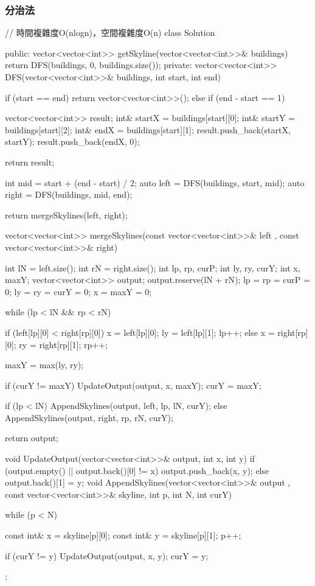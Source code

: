 \subsubsection{分治法}
\begin{Code}
// 時間複雜度O(nlogn)，空間複雜度O(n)
class Solution {
public:
    vector<vector<int>> getSkyline(vector<vector<int>>& buildings) {
        return DFS(buildings, 0, buildings.size());
    }
private:
    vector<vector<int>> DFS(vector<vector<int>>& buildings, int start, int end)
    {
        if (start == end)
        {
            return vector<vector<int>>();
        }
        else if (end - start == 1)
        {
            vector<vector<int>> result;
            int& startX = buildings[start][0];
            int& startY = buildings[start][2];
            int& endX = buildings[start][1];
            result.push_back({startX, startY});
            result.push_back({endX, 0});

            return result;
        }

        int mid = start + (end - start) / 2;
        auto left = DFS(buildings, start, mid);
        auto right = DFS(buildings, mid, end);

        return mergeSkylines(left, right);
    }
    vector<vector<int>> mergeSkylines(const vector<vector<int>>& left
                                      , const vector<vector<int>>& right)
    {
        int lN = left.size();
        int rN = right.size();
        int lp, rp, curP;
        int ly, ry, curY;
        int x, maxY;
        vector<vector<int>> output; output.reserve(lN + rN);
        lp = rp = curP = 0;
        ly = ry = curY = 0;
        x = maxY = 0;

        while (lp < lN && rp < rN)
        {
            if (left[lp][0] < right[rp][0])
            {
                x = left[lp][0];
                ly = left[lp][1];
                lp++;
            }
            else
            {
                x = right[rp][0];
                ry = right[rp][1];
                rp++;
            }

            maxY = max(ly, ry);

            if (curY != maxY)
            {
                UpdateOutput(output, x, maxY);
                curY = maxY;
            }
        }

        if (lp < lN)
            AppendSkylines(output, left, lp, lN, curY);
        else
            AppendSkylines(output, right, rp, rN, curY);


        return output;
    }
    void UpdateOutput(vector<vector<int>>& output, int x, int y)
    {
        if (output.empty() || output.back()[0] != x)
            output.push_back({x, y});
        else
            output.back()[1] = y;
    }
    void AppendSkylines(vector<vector<int>>& output
                        , const vector<vector<int>>& skyline, int p, int N, int curY)
    {
        while (p < N)
        {
            const int& x = skyline[p][0];
            const int& y = skyline[p][1];
            p++;

            if (curY != y)
            {
                UpdateOutput(output, x, y);
                curY = y;
            }
        }
    }
};
\end{Code}

